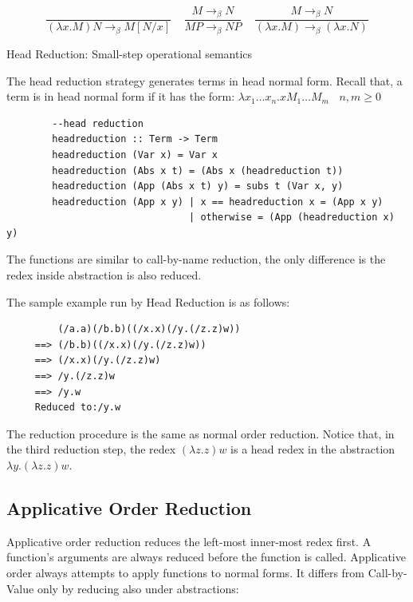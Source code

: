 \begin{equation*}
\frac{}{(\lambda x.M)N \rightarrow _\beta M[N/x]}\ \ \ \ \  
\frac{M \rightarrow _\beta N}{MP \rightarrow _\beta NP}\ \ \ \ \ 
\frac{M \rightarrow _\beta N}{(\lambda x.M) \rightarrow _\beta (\lambda x.N)}
\end{equation*}
\begin{center}
Head Reduction: Small-step operational semantics
\end{center}

The head reduction strategy generates terms in head normal form. Recall that, a term is in head normal form if it has the form: $\lambda x_1\ldots x_n.xM_1\ldots M_m\ \ \ \ n,m\geqslant 0$

\begin{verbatim}
        --head reduction
        headreduction :: Term -> Term
        headreduction (Var x) = Var x
        headreduction (Abs x t) = (Abs x (headreduction t))
        headreduction (App (Abs x t) y) = subs t (Var x, y)
        headreduction (App x y) | x == headreduction x = (App x y)
                                | otherwise = (App (headreduction x) y)  
\end{verbatim}

The functions are similar to call-by-name reduction, the only difference is the redex inside abstraction is also reduced.

\begin{exmp}
\normalfont The sample example run by Head Reduction is as follows:
\end{exmp}

\begin{verbatim}
         (/a.a)(/b.b)((/x.x)(/y.(/z.z)w))
     ==> (/b.b)((/x.x)(/y.(/z.z)w))
     ==> (/x.x)(/y.(/z.z)w)
     ==> /y.(/z.z)w
     ==> /y.w
     Reduced to:/y.w
\end{verbatim}

The reduction procedure is the same as normal order reduction. Notice that, in the third reduction step, the redex $(\lambda z.z)w$ is a head redex in the abstraction $\lambda y.(\lambda z.z)w$. 

\subsection{Applicative Order Reduction}

Applicative order reduction reduces the left-most inner-most redex first. A function's arguments are always reduced before the function is called. Applicative order always attempts to apply functions to normal forms. It differs from Call-by-Value only by reducing also under abstractions:


